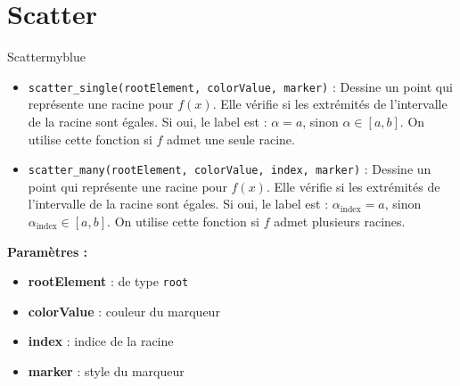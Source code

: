 \vspace{1cm}

\section{Scatter}
\begin{prettyBox}{Scatter}{myblue}
\begin{itemize}
    \item \texttt{scatter\_single(rootElement, colorValue, marker)} : Dessine un point
        qui représente une racine pour \( f(x) \). Elle vérifie si les extrémités de l'intervalle de la racine 
        sont égales. Si oui, le label est : \(\alpha = a\), sinon \(\alpha \in [a,b]\). On utilise cette fonction
        si \( f \) admet une seule racine.
    \item \texttt{scatter\_many(rootElement, colorValue, index, marker)} : Dessine un point
        qui représente une racine pour \( f(x) \). Elle vérifie si les extrémités de l'intervalle de la racine 
        sont égales. Si oui, le label est : \(\alpha_{\text{index}} = a\), sinon \(\alpha_{\text{index}} \in [a,b]\). On utilise cette fonction
        si \( f \) admet plusieurs racines.
\end{itemize}
\textbf{Paramètres :}  
\begin{itemize}
    \item \textbf{rootElement} : de type \texttt{root}
    \item \textbf{colorValue} : couleur du marqueur
    \item \textbf{index} : indice de la racine
    \item \textbf{marker} : style du marqueur
\end{itemize}
\end{prettyBox}
\vspace{0.5cm}


\newpage

